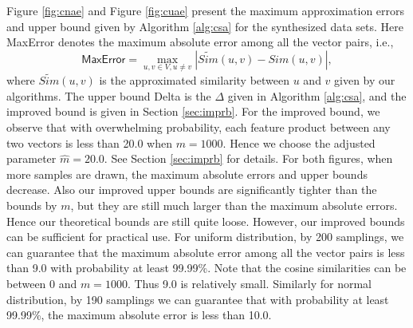 \documentclass{article}
\begin{document}
Figure \ref{fig:cnae} and Figure \ref{fig:cuae} present the maximum approximation errors and upper bound given by Algorithm \ref{alg:csa} for the synthesized data sets.
Here \textsf{MaxError} denotes the maximum absolute error among all the vector pairs, i.e.,
$$\textsf{MaxError} = \max_{u,v\in V,u\not= v} |\widetilde{Sim}(u,v) - Sim(u,v)|,$$
where $\widetilde{Sim}(u,v)$ is the approximated similarity between $u$ and $v$ given by our algorithms. The upper bound \textsf{Delta} is the $\Delta$ given in Algorithm \ref{alg:csa}, and the improved bound is given in Section \ref{sec:imprb}. For the improved bound, we observe that with overwhelming probability, each feature product between any two vectors is less than 20.0 when $m=1000$. Hence we choose the adjusted parameter $\hat{m} = 20.0$. See Section \ref{sec:imprb} for details. 
For both figures, when more samples are drawn, the maximum absolute errors and upper bounds decrease. Also our improved upper bounds are significantly tighter than the bounds by $m$, but they are still much larger than the maximum absolute errors. Hence our theoretical bounds are still quite loose. However, our improved bounds can be sufficient for practical use. For uniform distribution, by 200 samplings, we can guarantee that the maximum absolute error among all the vector pairs is less than 9.0 with probability at least 99.99\%. Note that the cosine similarities can be between 0 and $m=1000$. Thus 9.0 is relatively small. Similarly for normal distribution, by 190 samplings we can guarantee that with probability at least 99.99\%, the maximum absolute error is less than 10.0.
\end{document}
